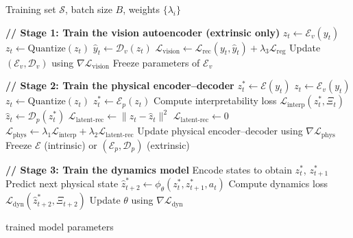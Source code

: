 \documentclass[nonacm,sigconf]{acmart}
\begin{document}
\begin{algorithm}[t]
\caption{
Training pipeline for PIWM. Models are trained in separate stages, freezing the
parameters of earlier stages before optimizing the next one.
}
\label{alg:piwm}
\begin{algorithmic}[1]

\Require Training set $\mathcal{S}$, batch size $B$, weights $\{\lambda_i\}$

\State \textbf{// Stage 1: Train the vision autoencoder (extrinsic only)}
        \State $z_t \gets \mathcal{E}_v(y_t)$
            \State $z_t \gets \text{Quantize}(z_t)$
        \EndIf
        \State $\hat{y}_t \gets \mathcal{D}_v(z_t)$
        \State $\mathcal{L}_{\text{vision}} \gets 
               \mathcal{L}_{\text{rec}}(y_t, \hat{y}_t) 
               + \lambda_3 \mathcal{L}_{\text{reg}}$
        \State Update $(\mathcal{E}_v, \mathcal{D}_v)$ using 
               $\nabla \mathcal{L}_{\text{vision}}$
      \EndFor
    \EndFor
    \State Freeze parameters of $\mathcal{E}_v$
\EndIf

\State \textbf{// Stage 2: Train the physical encoder–decoder}
        \State $z^*_t \gets \mathcal{E}(y_t)$
    \Else
        \State $z_t \gets \mathcal{E}_v(y_t)$
            \State $z_t \gets \text{Quantize}(z_t)$
        \EndIf
        \State $z^*_t \gets \mathcal{E}_p(z_t)$
    \EndIf
    \State Compute interpretability loss 
           $\mathcal{L}_{\text{interp}}(z^*_t, \Xi_t)$
        \State $\hat{z}_t \gets \mathcal{D}_p(z^*_t)$
        \State $\mathcal{L}_{\text{latent-rec}} \gets 
               \|z_t - \hat{z}_t\|^2$
    \Else
        \State $\mathcal{L}_{\text{latent-rec}} \gets 0$
    \EndIf
    \State $\mathcal{L}_{\text{phys}} \gets 
           \lambda_1 \mathcal{L}_{\text{interp}}
           + \lambda_2 \mathcal{L}_{\text{latent-rec}}$
    \State Update physical encoder–decoder using $\nabla \mathcal{L}_{\text{phys}}$
  \EndFor
\EndFor
\State Freeze $\mathcal{E}$ (intrinsic) or $(\mathcal{E}_p, \mathcal{D}_p)$ (extrinsic)

\State \textbf{// Stage 3: Train the dynamics model}
    \State Encode states to obtain $z^*_t$, $z^*_{t+1}$
    \State Predict next physical state 
           $\hat{z}^*_{t+2} \gets \phi_\theta(z^*_t, z^*_{t+1}, a_t)$
    \State Compute dynamics loss 
           $\mathcal{L}_{\text{dyn}}(\hat{z}^*_{t+2}, \Xi_{t+2})$
    \State Update $\theta$ using $\nabla \mathcal{L}_{\text{dyn}}$
  \EndFor
\EndFor

\State \Return trained model parameters
\end{algorithmic}
\end{algorithm}
\end{document}

